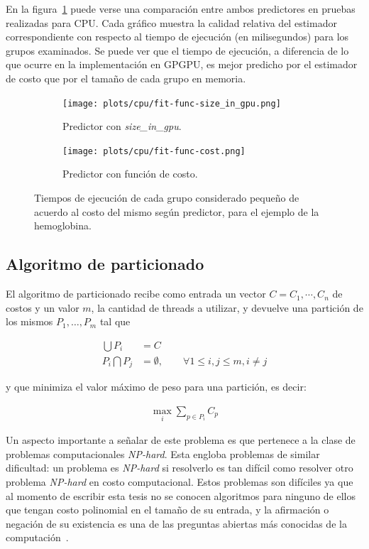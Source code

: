 En la figura~\ref{fig:comp-size-cost} puede verse una comparaci\'on entre ambos
predictores en pruebas realizadas para CPU. Cada gr\'afico muestra la calidad
relativa del estimador correspondiente con respecto al tiempo de ejecuci\'on
(en milisegundos) para los grupos examinados. Se puede ver que el tiempo de
ejecuci\'on, a diferencia de lo que ocurre en la implementaci\'on en GPGPU, es
mejor predicho por el estimador de costo que por el tama\~no de cada grupo en
memoria.

\begin{figure}[htbp]
   \centering
   \begin{subfigure}[b]{\plotwidthtres}
     \texttt{[image: plots/cpu/fit-func-size\_in\_gpu.png]}
     \caption{Predictor con \textit{size\_in\_gpu}.}
   \end{subfigure}
   \begin{subfigure}[b]{\plotwidthtres}
     \texttt{[image: plots/cpu/fit-func-cost.png]}
     \caption{Predictor con funci\'on de costo.}
   \end{subfigure}
   \caption{Tiempos de ejecuci\'on de cada grupo considerado peque\~no de acuerdo
    al costo del mismo seg\'un predictor, para el ejemplo de la hemoglobina.}
   \label{fig:comp-size-cost}
\end{figure}

\subsection{Algoritmo de particionado}

El algoritmo de particionado recibe como entrada un vector $C = {C_1, \cdots, C_n}$
de costos y un valor $m$, la cantidad de threads a utilizar, y devuelve una
partici\'on de los mismos $P_1, \dots, P_m$ tal que

\begin{align}
    \bigcup P_i & = C \\
    P_i \bigcap P_j & = \emptyset, \qquad \forall 1 \leq i,j \leq m, i \neq j
    \label{eq:partition-conditions}
\end{align}

y que minimiza el valor m\'aximo de peso para una partici\'on, es decir:

\begin{align}
    \displaystyle \max_i \sum_{p \in P_i} C_p
\end{align}

Un aspecto importante a se\~nalar de este problema es que pertenece a la clase
de problemas computacionales \textit{NP-hard}. Esta engloba problemas de similar
dificultad: un problema es \textit{NP-hard} si resolverlo es tan dif\'icil como
resolver otro problema \textit{NP-hard} en costo computacional. Estos problemas
son dif\'iciles ya que al momento de escribir esta tesis no se conocen algoritmos
para ninguno de ellos que tengan costo polinomial en el tama\~no de su entrada, y
la afirmaci\'on o negaci\'on de su existencia es una de las preguntas abiertas
m\'as conocidas de la computaci\'on~\cite{Cormen}.

